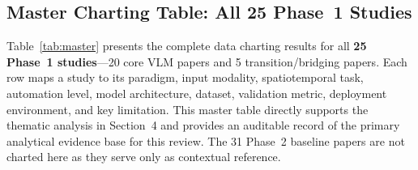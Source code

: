 \documentclass[10pt,letterpaper]{article}
\begin{document}
\subsection{Master Charting Table: All 25 Phase~1 Studies}

Table~\ref{tab:master} presents the complete data charting results for all \textbf{25 Phase~1 studies}---20 core VLM papers and 5 transition/bridging papers. Each row maps a study to its paradigm, input modality, spatiotemporal task, automation level, model architecture, dataset, validation metric, deployment environment, and key limitation. This master table directly supports the thematic analysis in Section~4 and provides an auditable record of the primary analytical evidence base for this review. The 31 Phase~2 baseline papers are not charted here as they serve only as contextual reference.
\end{document}
